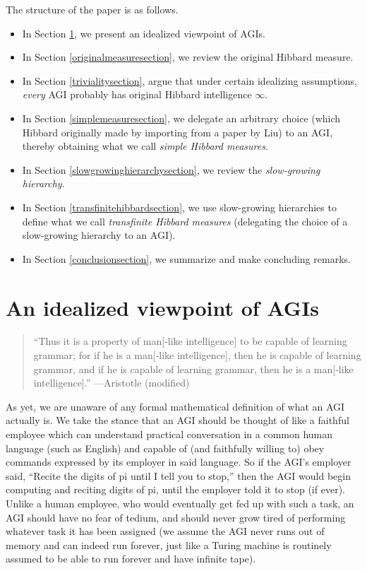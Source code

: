 \documentclass{article}
\begin{document}
The structure of the paper is as follows.
\begin{itemize}
    \item
    In Section \ref{agiperspectivesection}, we present an idealized viewpoint of AGIs.
    \item
    In Section \ref{originalmeasuresection}, we review the original Hibbard measure.
    \item
    In Section \ref{trivialitysection}, argue that
    under certain idealizing assumptions, \emph{every} AGI probably has
    original Hibbard intelligence $\infty$.
    \item
    In Section \ref{simplemeasuresection}, we delegate an arbitrary choice
    (which Hibbard originally made by importing from a paper by Liu) to an AGI,
    thereby obtaining what we call \emph{simple Hibbard measures}.
    \item
    In Section \ref{slowgrowinghierarchysection}, we review the \emph{slow-growing hierarchy}.
    \item
    In Section \ref{transfinitehibbardsection}, we use
    slow-growing hierarchies to define what we call \emph{transfinite Hibbard measures}
    (delegating the choice of a slow-growing hierarchy to an AGI).
    \item
    In Section \ref{conclusionsection}, we summarize and make concluding remarks.
\end{itemize}

\section{An idealized viewpoint of AGIs}
\label{agiperspectivesection}

\begin{quote}
    ``Thus it is a property of man[-like intelligence] to be capable of learning
    grammar; for if he is a man[-like intelligence], then he is capable of learning
    grammar, and if he is capable of learning grammar, then he is
    a man[-like intelligence].'' ---Aristotle \cite{aristotle} (modified)
\end{quote}

As yet, we are unaware of any formal mathematical definition of what an AGI
actually is. We take the stance that an AGI should be thought of like a faithful
employee which can understand
practical conversation in a common human language (such as
English) and capable of (and faithfully willing to) obey commands
expressed by its employer in said language.
So if the AGI's employer said, ``Recite the digits of pi until I tell you to
stop,'' then the AGI would begin computing and reciting digits of pi, until the
employer told it to stop (if ever). Unlike a human employee, who would eventually
get fed up with such a task, an AGI should have no fear of tedium, and should
never grow tired of performing whatever task it has been assigned (we assume
the AGI never runs out of memory and can indeed run forever, just like a Turing
machine is routinely assumed to be able to run forever and have infinite tape).
\end{document}
